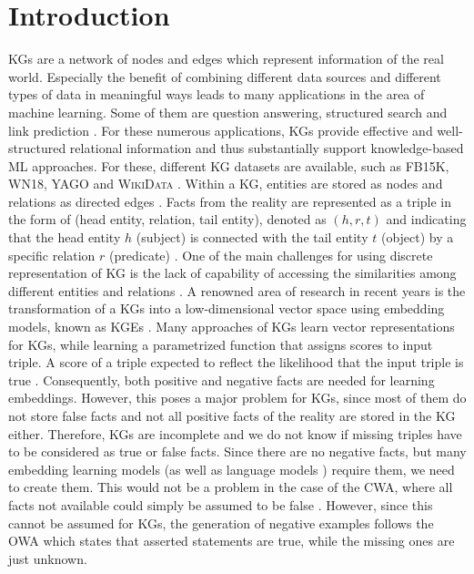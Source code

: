 \chapter{Introduction}
\label{ch:introduction}

\acp{KG} are a network of nodes and edges which represent information of the real world. 
Especially the benefit of combining different data sources and different types of data in meaningful ways leads to many applications in the area of machine learning.
Some of them are question answering, structured search \cite{zhang2019nscaching} and link prediction \cite{cai2017kbgan, Alam2020AffinityDN}.
For these numerous applications, \acp{KG} provide effective and well-structured relational information and thus substantially support knowledge-based ML approaches.
For these, different \ac{KG} datasets are available, such as \textsc{FB15K}, \textsc{WN18}, \textsc{YAGO} \cite{ConEx} and \textsc{WikiData} \cite{arnaoutwikinegata}.
Within a \ac{KG}, entities are stored as nodes and relations as directed edges \cite{zhang2019nscaching}.
Facts from the reality are represented as a triple in the form of (head entity, relation, tail entity), denoted as $(h, r, t)$ and indicating that the head entity $h$ (subject) is connected with the tail entity $t$ (object) by a specific relation $r$ (predicate) \cite{zhang2019nscaching, Alam2020AffinityDN}.
One of the main challenges for using discrete representation of \ac{KG} is the lack of capability of accessing the similarities among different entities and relations \cite{cai2017kbgan}. 
A renowned area of research in recent years is the transformation of a \acp{KG} into a low-dimensional vector space using embedding models, known as \acp{KGE} \cite{Alam2020AffinityDN}.
Many approaches of \acp{KG} learn vector representations for \acp{KG}, while learning a parametrized function that assigns scores to input triple.
A score of a triple expected to reflect the likelihood that the input triple is true \cite{ConvE}.
Consequently, both positive and negative facts are needed for learning embeddings. 
However, this poses a major problem for \acp{KG}, since most of them do not store false facts and not all positive facts of the reality are stored in the \ac{KG} either.
Therefore, \acp{KG} are incomplete and we do not know if missing triples have to be considered as true or false facts.
Since there are no negative facts, but many embedding learning models (as well as language models \cite{MikolovSCCD13}) require them, we need to create them.
This would not be a problem in the case of the \ac{CWA}, where all facts not available could simply be assumed to be false \cite{arnaout2020enriching}.
However, since this cannot be assumed for \acp{KG}, the generation of negative examples follows the \ac{OWA} which states that asserted statements are true, while the missing ones are just unknown.


